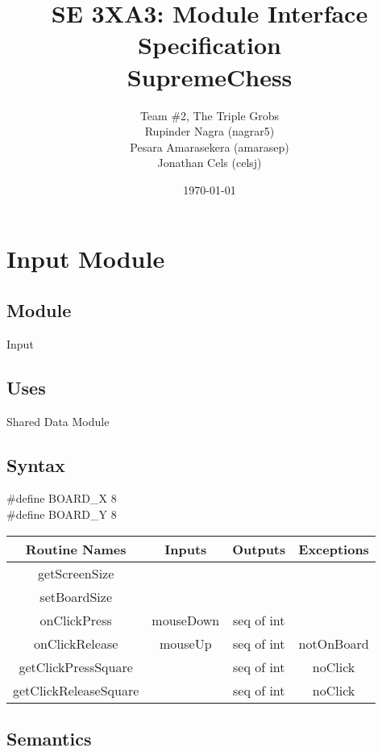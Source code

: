 \documentclass{article}
\title{SE 3XA3: Module Interface Specification\\SupremeChess}
\author{Team \#2, The Triple Grobs
		\\ Rupinder Nagra (nagrar5)
		\\ Pesara Amarasekera (amarasep)
		\\ Jonathan Cels (celsj)
}
\date{\today}
\begin{document}
\maketitle

\newpage
\section*{Input Module}
    \subsection*{Module}
        Input
    
    \subsection*{Uses}
        Shared Data Module
    
    \subsection*{Syntax}
        \#define BOARD\_X 8\\
        \#define BOARD\_Y 8
        
        \begin{center}
            \begin{tabular}{|c|c|c|c|} 
                \hline
                Routine Names & Inputs & Outputs & Exceptions \\
                \hline
                getScreenSize & & & \\
                \hline
                setBoardSize & & & \\ 
                \hline
                onClickPress & mouseDown & seq of int & \\ 
                \hline
                onClickRelease & mouseUp & seq of int & notOnBoard \\
                \hline
                getClickPressSquare & & seq of int & noClick\\
                \hline
                getClickReleaseSquare & & seq of int & noClick\\
                \hline
            \end{tabular}
        \end{center}
    
    \subsection*{Semantics}
\end{document}
